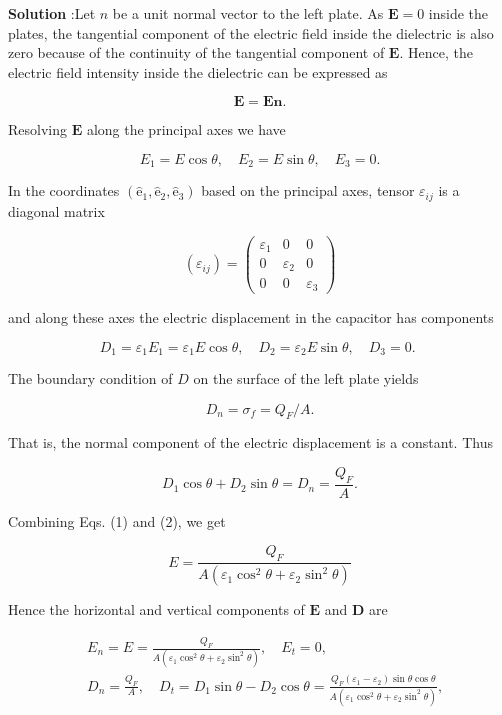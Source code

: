 \documentclass[10pt]{article}
\begin{document}
\textbf{Solution} :Let $n$ be a unit normal vector to the left plate. As $\mathbf{E}=0$ inside the plates, the tangential component of the electric field inside the dielectric is also zero because of the continuity of the tangential component of $\mathbf{E}$. Hence, the electric field intensity inside the dielectric can be expressed as

$$
\mathbf{E}=\boldsymbol{E n} .
$$

Resolving $\mathbf{E}$ along the principal axes we have

$$
E_{1}=E \cos \theta, \quad E_{2}=E \sin \theta, \quad E_{3}=0 .
$$

In the coordinates $\left(\hat{\mathrm{e}}_{1}, \hat{\mathrm{e}}_{2}, \hat{\mathrm{e}}_{3}\right)$ based on the principal axes, tensor $\varepsilon_{i j}$ is a diagonal matrix

$$
\left(\varepsilon_{i j}\right)=\left(\begin{array}{ccc}
\varepsilon_{1} & 0 & 0 \\
0 & \varepsilon_{2} & 0 \\
0 & 0 & \varepsilon_{3}
\end{array}\right)
$$

and along these axes the electric displacement in the capacitor has components

$$
D_{1}=\varepsilon_{1} E_{1}=\varepsilon_{1} E \cos \theta, \quad D_{2}=\varepsilon_{2} E \sin \theta, \quad D_{3}=0 \text {. }
$$

The boundary condition of $D$ on the surface of the left plate yields

$$
D_{n}=\sigma_{f}=Q_{F} / A .
$$

That is, the normal component of the electric displacement is a constant. Thus

$$
D_{1} \cos \theta+D_{2} \sin \theta=D_{n}=\frac{Q_{F}}{A} .
$$

Combining Eqs.
(1) and (2), we get

$$
E=\frac{Q_{F}}{A\left(\varepsilon_{1} \cos ^{2} \theta+\varepsilon_{2} \sin ^{2} \theta\right)}
$$

Hence the horizontal and vertical components of $\mathbf{E}$ and $\mathbf{D}$ are

$$
\begin{aligned}
&E_{n}=E=\frac{Q_{F}}{A\left(\varepsilon_{1} \cos ^{2} \theta+\varepsilon_{2} \sin ^{2} \theta\right)}, \quad E_{t}=0, \\
&D_{n}=\frac{Q_{F}}{A}, \quad D_{t}=D_{1} \sin \theta-D_{2} \cos \theta=\frac{Q_{F}\left(\varepsilon_{1}-\varepsilon_{2}\right) \sin \theta \cos \theta}{A\left(\varepsilon_{1} \cos ^{2} \theta+\varepsilon_{2} \sin ^{2} \theta\right)},
\end{aligned}
$$
\end{document}
